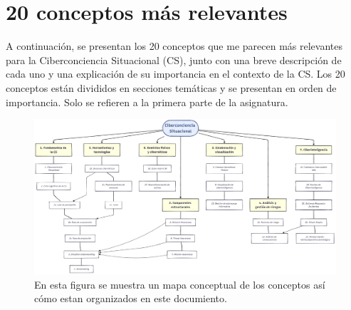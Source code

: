 \chapter{20 conceptos más relevantes}



A continuación, se presentan los 20 conceptos que me parecen más relevantes para la Ciberconciencia Situacional (CS), junto con una breve descripción de cada uno y una explicación de su importancia en el contexto de la CS.
Los 20 conceptos están divididos en secciones temáticas y se presentan en orden de importancia.
Solo se refieren a la primera parte de la asignatura.


\begin{figure}[htbp]
   \centering
   \includegraphics[width=0.99\columnwidth]{images/00/mapa.png}
   \caption{En esta figura se muestra un mapa conceptual de los conceptos así cómo estan organizados en este documiento.}
   \label{fig:00/mapa}
\end{figure}

\newpage
